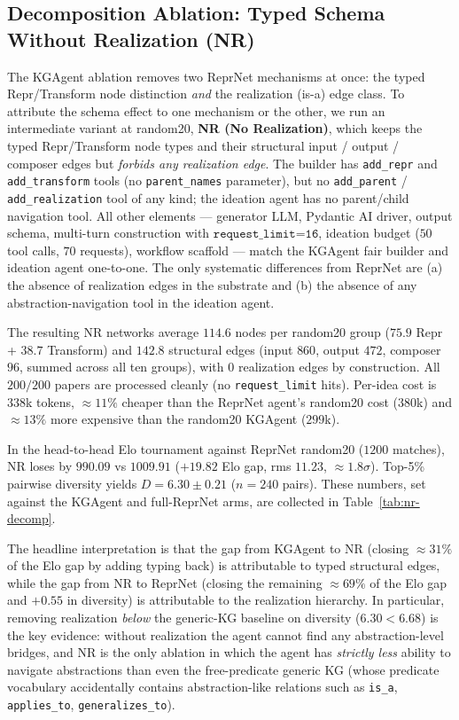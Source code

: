 \documentclass[10pt,twocolumn]{article}
\begin{document}
\subsection{Decomposition Ablation: Typed Schema Without Realization (NR)}
\label{app:nr-ablation}

The KGAgent ablation removes two ReprNet mechanisms at once: the
typed Repr/Transform node distinction \emph{and} the realization
(is-a) edge class.  To attribute the schema effect to one
mechanism or the other, we run an intermediate variant at
random20, \textbf{NR (No Realization)}, which
keeps the typed Repr/Transform node types and their structural
input / output / composer edges but \emph{forbids any realization
edge}.  The builder has \texttt{add\_repr} and \texttt{add\_transform}
tools (no \texttt{parent\_names} parameter), but no
\texttt{add\_parent} / \texttt{add\_realization} tool of any kind;
the ideation agent has no parent/child navigation tool.  All other
elements --- generator LLM, Pydantic AI driver, output schema,
multi-turn construction with $\texttt{request\_limit=16}$, ideation
budget ($50$ tool calls, $70$ requests), workflow scaffold ---
match the KGAgent fair builder and ideation agent one-to-one.  The
only systematic differences from ReprNet are (a) the absence of
realization edges in the substrate and (b) the absence of any
abstraction-navigation tool in the ideation agent.

The resulting NR networks average $114.6$ nodes per random20
group ($75.9$ Repr + $38.7$ Transform) and $142.8$ structural
edges (input $860$, output $472$, composer $96$, summed across
all ten groups), with $0$ realization edges by construction.
All $200/200$ papers are processed cleanly (no
\texttt{request\_limit} hits).  Per-idea cost is $338$k tokens,
$\approx 11\%$ cheaper than the ReprNet agent's random20 cost
($380$k) and $\approx 13\%$ more expensive than the random20
KGAgent ($299$k).

In the head-to-head Elo tournament against ReprNet random20
($1200$ matches), NR loses by $990.09$ vs $1009.91$ ($+19.82$
Elo gap, rms $11.23$, $\approx 1.8\sigma$).  Top-5\% pairwise
diversity yields $D = 6.30 \pm 0.21$ ($n=240$ pairs).  These
numbers, set against the KGAgent and full-ReprNet arms, are
collected in Table~\ref{tab:nr-decomp}.

The headline interpretation is that the gap from KGAgent to NR
(closing $\approx 31\%$ of the Elo gap by adding typing back) is
attributable to typed structural edges, while the gap from NR to
ReprNet (closing the remaining $\approx 69\%$ of the Elo gap and
$+0.55$ in diversity) is attributable to the realization
hierarchy.  In particular, removing realization \emph{below} the
generic-KG baseline on diversity ($6.30 < 6.68$) is the key
evidence: without realization the agent cannot find any
abstraction-level bridges, and NR is the only ablation in which
the agent has \emph{strictly less} ability to navigate
abstractions than even the free-predicate generic KG (whose
predicate vocabulary accidentally contains abstraction-like
relations such as \texttt{is\_a}, \texttt{applies\_to},
\texttt{generalizes\_to}).
\end{document}
